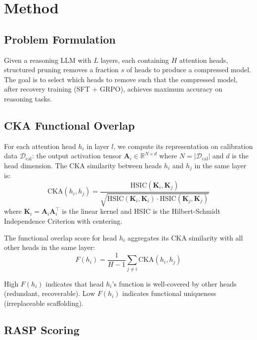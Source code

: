 \documentclass[11pt,a4paper]{article}
\begin{document}
\section{Method}

\subsection{Problem Formulation}

Given a reasoning LLM with $L$ layers, each containing $H$ attention heads, structured pruning removes a fraction $s$ of heads to produce a compressed model. The goal is to select which heads to remove such that the compressed model, after recovery training (SFT + GRPO), achieves maximum accuracy on reasoning tasks.

\subsection{CKA Functional Overlap}

For each attention head $h_i$ in layer $l$, we compute its representation on calibration data $\mathcal{D}_{\text{cal}}$: the output activation tensor $\mathbf{A}_i \in \mathbb{R}^{N \times d}$ where $N = |\mathcal{D}_{\text{cal}}|$ and $d$ is the head dimension. The CKA similarity between heads $h_i$ and $h_j$ in the same layer is:
\begin{equation}
\text{CKA}(h_i, h_j) = \frac{\text{HSIC}(\mathbf{K}_i, \mathbf{K}_j)}{\sqrt{\text{HSIC}(\mathbf{K}_i, \mathbf{K}_i) \cdot \text{HSIC}(\mathbf{K}_j, \mathbf{K}_j)}}
\end{equation}
where $\mathbf{K}_i = \mathbf{A}_i \mathbf{A}_i^\top$ is the linear kernel and HSIC is the Hilbert-Schmidt Independence Criterion with centering.

The functional overlap score for head $h_i$ aggregates its CKA similarity with all other heads in the same layer:
\begin{equation}
F(h_i) = \frac{1}{H-1}\sum_{j \neq i} \text{CKA}(h_i, h_j)
\end{equation}

High $F(h_i)$ indicates that head $h_i$'s function is well-covered by other heads (redundant, recoverable). Low $F(h_i)$ indicates functional uniqueness (irreplaceable scaffolding).

\subsection{RASP Scoring}
\end{document}

